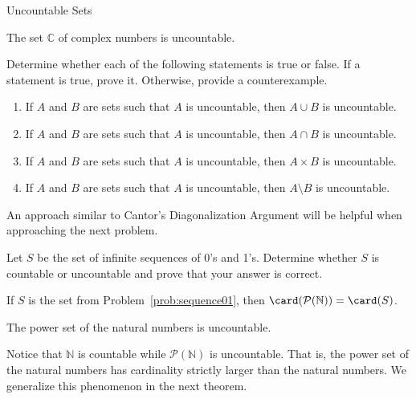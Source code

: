 \begin{section}{Uncountable Sets}
\begin{theorem}
The set $\mathbb{C}$ of complex numbers is uncountable.
\end{theorem}

\begin{problem}
Determine whether each of the following statements is true or false. If a statement is true, prove it.  Otherwise, provide a counterexample.
\begin{enumerate}[label=\textrm{(\alph*)}]
\item If $A$ and $B$ are sets such that $A$ is uncountable, then $A\cup B$ is uncountable.
\item If $A$ and $B$ are sets such that $A$ is uncountable, then $A\cap B$ is uncountable.
\item If $A$ and $B$ are sets such that $A$ is uncountable, then $A\times B$ is uncountable.
\item If $A$ and $B$ are sets such that $A$ is uncountable, then $A\setminus B$ is uncountable.
\end{enumerate}
\end{problem}

An approach similar to Cantor's Diagonalization Argument will be helpful when approaching the next problem. 

\begin{problem}\label{prob:sequence01} 
Let $S$ be the set of infinite sequences of 0's and 1's. Determine whether $S$ is countable or uncountable and prove that your answer is correct. 
\end{problem}

\begin{theorem}
If $S$ is the set from Problem~\ref{prob:sequence01}, then $\card(\mathcal{P}(\mathbb{N}))=\card(S)$.
\end{theorem}

\begin{corollary}\label{cor:power set of N uncountable}
The power set of the natural numbers is uncountable.
\end{corollary}

Notice that $\mathbb{N}$ is countable while $\mathcal{P}(\mathbb{N})$ is uncountable.  That is, the power set of the natural numbers has cardinality strictly larger than the natural numbers. We generalize this phenomenon in the next theorem.


\end{section}

